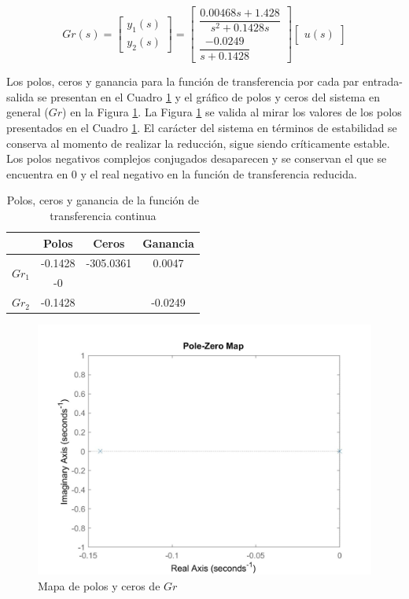 \documentclass[journal]{IEEEtran}
\begin{document}
\begin{equation}
\label{tf:Gr}
Gr(s)=\begin{bmatrix}
	y_1(s)\\
	y_2(s)
\end{bmatrix} = 
\begin{bmatrix}
\dfrac{0.00468 s + 1.428}{s^2 + 0.1428 s}\\
\dfrac{-0.0249}{s + 0.1428}
\end{bmatrix}
\begin{bmatrix}
	u(s)
\end{bmatrix}
\end{equation}

Los polos, ceros y ganancia para la función de transferencia por cada par entrada-salida se presentan en el Cuadro \ref{tab: pzg tfr} y el gráfico de polos y ceros del sistema en general ($Gr$) en la Figura \ref{fig:pzGr}. La Figura \ref{fig:pzGr} se valida al mirar los valores de los polos presentados en el Cuadro \ref{tab: pzg tfr}. El carácter del sistema en términos de estabilidad se conserva al momento de realizar la reducción, sigue siendo críticamente estable. Los polos negativos complejos conjugados desaparecen y se conservan el que se encuentra en 0 y el real negativo en la función de transferencia reducida.

\begin{table}[!h]
\centering
\caption{Polos, ceros y ganancia de la función de transferencia continua}
\label{tab: pzg tfr}
\begin{tabular}{@{}lccc@{}}
\toprule
                  & Polos & Ceros             & Ganancia          \\ \midrule
\multirow{2}{*}{$Gr_1$} & -0.1428 & -305.0361 & 0.0047 \\
                  & -0 & &                   \\
                 \midrule
$Gr_2$ & -0.1428 &  & -0.0249                 
                  \\ \bottomrule
\end{tabular}
\end{table}

\begin{figure}[ht!]
\caption{Mapa de polos y ceros de $Gr$\label{fig:pzGr}}
  \centering
\includegraphics[scale=0.18]{tf/pzmap_Gr.jpg}
\end{figure}
\end{document}
